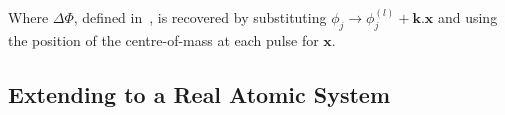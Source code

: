 Where $\Delta \Phi$, defined
in~, is recovered by substituting 
$\phi_j \rightarrow \phi_j^{(l)} + \textbf{k.x}$ and using the
position of the centre-of-mass at each pulse for $\textbf{x}$.
\subsection{Extending to a Real Atomic System}

